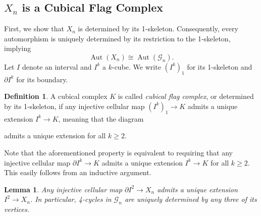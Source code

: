 \documentclass[reqno,dvipsnames]{amsart}
\theoremstyle{plain}
\newtheorem{lemma}[theorem]{Lemma}
\numberwithin{equation}{section}
\theoremstyle{definition}
\newtheorem{definition}[theorem]{Definition}
\DeclareMathOperator{\Aut}{Aut}
\begin{document}
	\subsection{\texorpdfstring{$X_n$}{Xn} is a Cubical Flag Complex}

		First, we show that $X_n$ is determined by its 1-skeleton. Consequently, every automorphism is uniquely determined by its restriction to the 1-skeleton, implying
		\[
			\Aut(X_n) \cong \Aut(\mathcal{G}_n).
		\]
		Let $I$ denote an interval and $I^k$ a $k$-cube. We write $(I^k)_1$ for its 1-skeleton and $\partial I^k$ for its boundary.

		\begin{definition}
			A cubical complex $K$ is called \textit{cubical flag complex}, or determined by its 1-skeleton, if any injective cellular map $(I^k)_1 \to K$ admits a unique extension $I^k\to K$, meaning that the diagram
			\begin{center}
			\end{center}
			admits a unique extension for all $k\geq2$.
		\end{definition}

		Note that the aforementioned property is equivalent to requiring that any injective cellular map $\partial I^k \to K$ admits a unique extension $I^k \to K$ for all $k\geq 2$. This easily follows from an inductive argument.

		\begin{lemma} \label{lem:FourCycles}
			Any injective cellular map $\partial I^2 \to X_n$ admits a unique extension $I^2 \to X_n$. In particular, 4-cycles in $\mathcal{G}_n$ are uniquely determined by any three of its vertices.
		\end{lemma}
\end{document}
